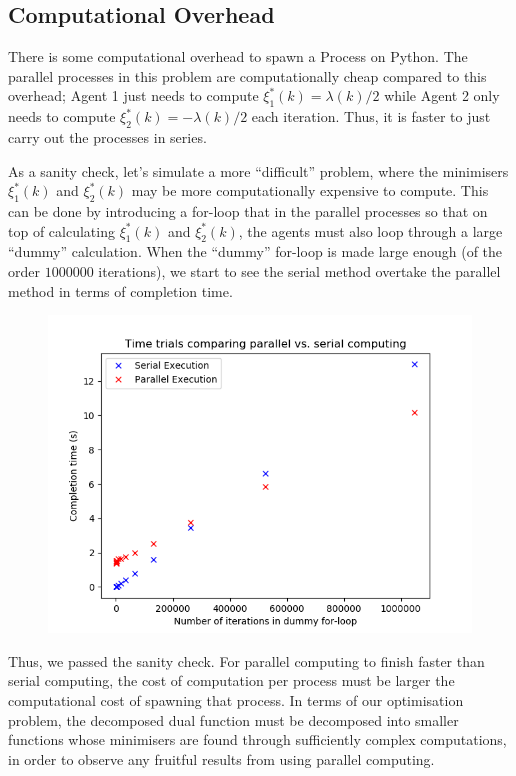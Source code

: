 \documentclass[12pt]{article}
\begin{document}
\subsection*{Computational Overhead}

There is some computational overhead to spawn a Process on Python. The parallel processes in this problem are computationally cheap compared to this overhead; Agent 1 just needs to compute $\xi_1^*(k)=\lambda(k)/2$ while Agent 2 only needs to compute $\xi_2^*(k)=-\lambda(k)/2$ each iteration. Thus, it is faster to just carry out the processes in series.

As a sanity check, let's simulate a more ``difficult'' problem, where the minimisers $\xi_1^*(k)$ and $\xi_2^*(k)$ may be more computationally expensive to compute. This can be done by introducing a for-loop that in the parallel processes so that on top of calculating $\xi_1^*(k)$ and $\xi_2^*(k)$, the agents must also loop through a large ``dummy'' calculation. When the ``dummy'' for-loop is made large enough (of the order $1000000$ iterations), we start to see the serial method overtake the parallel method in terms of completion time.

\begin{figure}[H]
	\includegraphics[scale=1]{Problem1-TimeTrial.png}
\end{figure}

Thus, we passed the sanity check. For parallel computing to finish faster than serial computing, the cost of computation per process must be larger the computational cost of spawning that process. In terms of our optimisation problem, the decomposed dual function must be decomposed into smaller functions whose minimisers are found through sufficiently complex computations, in order to observe any fruitful results from using parallel computing.
\end{document}
